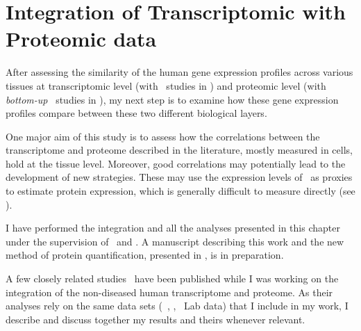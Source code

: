 \chapter{Integration of Transcriptomic with Proteomic data}\label{ch:Integration}
\setlength{\epigraphwidth}{0.8\textwidth}
\setlength{\epigraphrule}{0pt}

\vspace{2cm}
After assessing the similarity of the human gene expression profiles
across various tissues
at transcriptomic level (with \Rnaseq\ studies in )
and proteomic level (with \emph{bottom-up} \ms\ studies in ),
my next step is to examine how these gene expression profiles
compare between these two different biological layers.\mybr\

One major aim of this study is to assess
how the correlations between the transcriptome and proteome
described in the literature, mostly measured in cells,
hold at the tissue level.
Moreover, good correlations may potentially lead to
the development of new strategies.
These may use the expression levels of \mRNA\ as proxies
to estimate protein expression,
which is generally difficult to measure directly (see ).\mybr\

I have performed the integration and all the analyses presented in this chapter
under the supervision of \alvis\ and \jyoti.
A manuscript describing this work
and the new method of protein quantification, presented in ,
is in preparation.\mybr\

A few closely related studies~ have
been published while I was working on
the integration of the non-diseased human transcriptome and proteome.
As their analyses rely on the same data sets (\ie\ \uhlen, \gtex, \pandey\ Lab data)
that I include in my work,
I describe and discuss together my results and theirs
whenever relevant.\mybr\

